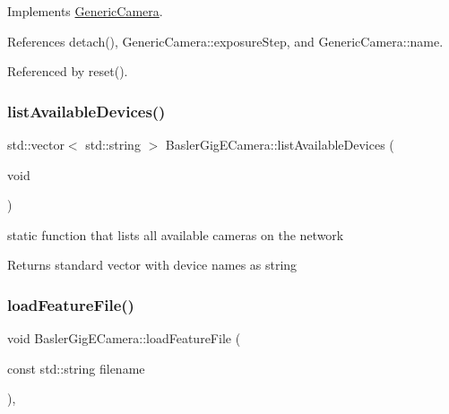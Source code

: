 Implements \hyperlink{classGenericCamera_ad050957bbb8003fc55f4656d43347f1e}{Generic\+Camera}.



References detach(), Generic\+Camera\+::exposure\+Step, and Generic\+Camera\+::name.



Referenced by reset().

\mbox{\label{classBaslerGigECamera_ad5460ff8176dd5ad111d5b9d11753ab0}} 
\subsubsection{\texorpdfstring{list\+Available\+Devices()}{listAvailableDevices()}}
{\footnotesize\ttfamily std\+::vector$<$ std\+::string $>$ Basler\+Gig\+E\+Camera\+::list\+Available\+Devices (\begin{DoxyParamCaption}\item[{void}]{ }\end{DoxyParamCaption})\hspace{0.3cm}{\ttfamily [static]}}

static function that lists all available cameras on the network \begin{DoxyReturn}{Returns}
standard vector with device names as string 
\end{DoxyReturn}
\mbox{\label{classBaslerGigECamera_aa7e8cde9ecc7b2375146f41a6e35840e}} 
\subsubsection{\texorpdfstring{load\+Feature\+File()}{loadFeatureFile()}}
{\footnotesize\ttfamily void Basler\+Gig\+E\+Camera\+::load\+Feature\+File (\begin{DoxyParamCaption}\item[{const std\+::string}]{filename }\end{DoxyParamCaption})\hspace{0.3cm}{\ttfamily [override]}, {\ttfamily [virtual]}}

